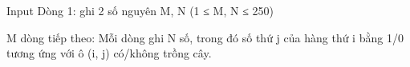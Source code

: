 Input
Dòng 1: ghi 2 số nguyên M, N (1 ≤ M, N ≤ 250)  

   M dòng tiếp theo: Mỗi dòng ghi N số, trong đó số thứ j của hàng thứ i bằng 1/0 tương ứng với ô (i, j) có/không trồng cây.